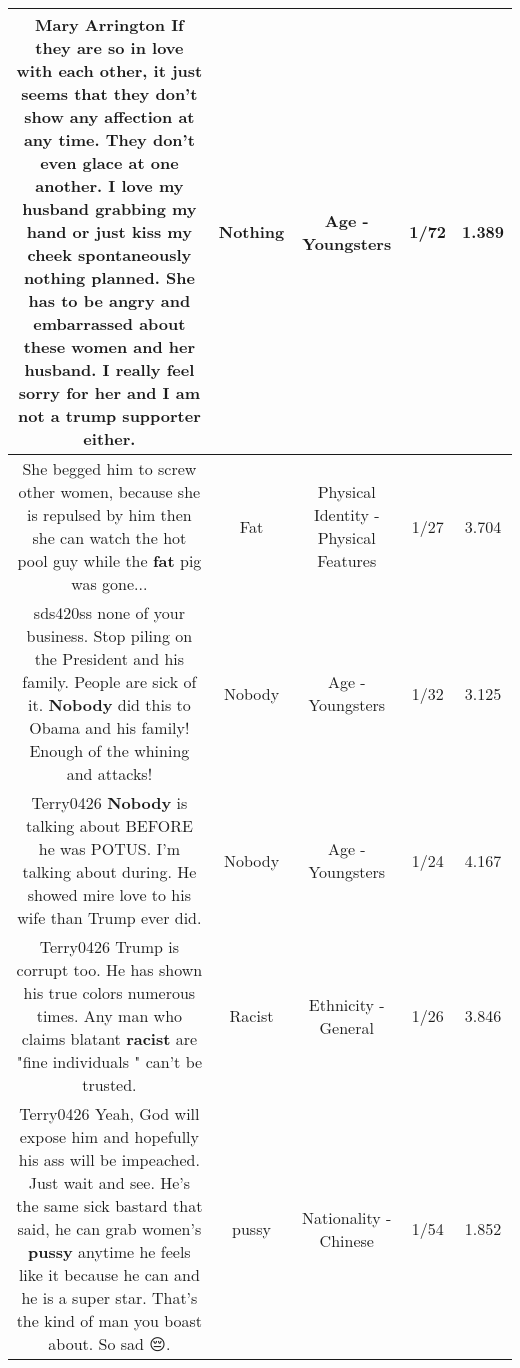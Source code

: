 \documentclass[11pt]{article}
\newlength\mylength
\begin{document}
\begin{center}
\begin{longtable}{|C{.65\mylength}|C{.30\mylength}|C{.12\mylength}|C{.12\mylength}|C{.12\mylength}|}
  \small Mary Arrington If they are so in love with each other, it just seems that they don't show any affection at any time. They don't even glace at one another. I love my husband grabbing my hand or just kiss my cheek spontaneously \textbf{nothing} planned. She  has to be angry and embarrassed about these women  and her husband. I really feel sorry for her and I am not a trump supporter either.\normalsize   & Nothing & Age - Youngsters & 1/72 & 1.389 \\  \hline
  \small She begged him to screw other women, because she is repulsed by him then she can watch the hot pool guy while the \textbf{fat} pig was gone...\normalsize   & Fat & Physical Identity - Physical Features & 1/27 & 3.704 \\  \hline
  \small sds420ss none of your business. Stop piling on the President and his family. People are sick of it. \textbf{Nobody} did this to Obama and his family! Enough of the whining and attacks!\normalsize   & Nobody & Age - Youngsters & 1/32 & 3.125 \\  \hline
  \small Terry0426 \textbf{Nobody} is talking about BEFORE he was POTUS.  I'm talking about during. He showed mire love to his wife than Trump ever did.\normalsize   & Nobody & Age - Youngsters & 1/24 & 4.167 \\  \hline
  \small Terry0426 Trump is corrupt too.  He has shown his true colors numerous times.  Any man who claims blatant \textbf{racist} are "fine individuals " can't be trusted.\normalsize   & Racist & Ethnicity - General & 1/26 & 3.846 \\  \hline
  \small Terry0426 Yeah, God will expose him and hopefully his ass will be impeached.  Just wait and see.  He's the same sick bastard that said,  he can grab women's \textbf{pussy} anytime he feels like it because he can and he is a super star. That's the kind of man you boast about. So sad 😔.\normalsize   & pussy & Nationality - Chinese & 1/54 & 1.852 \\  \hline

\end{longtable}
\end{center}
\end{document}
